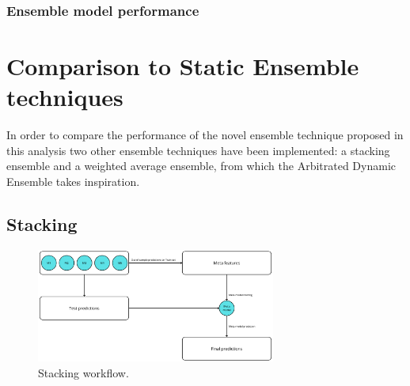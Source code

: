 \subsubsection{Ensemble model performance}


\section{Comparison to Static Ensemble techniques}
In order to compare the performance of the novel ensemble technique proposed in this analysis two other ensemble techniques have been implemented: a stacking ensemble and a weighted average ensemble, from which the Arbitrated Dynamic Ensemble takes inspiration.

\subsection{Stacking}
  \begin{figure}[H]
    \centering
    \includegraphics[width=0.7\textwidth]{Machine_learning_thesis/Images/Stacking workflow.png}
    \caption{Stacking workflow.} 
    \label{fig:Stacking workflow}
\end{figure}

